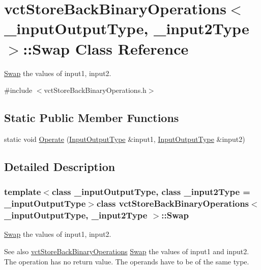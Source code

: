 \hypertarget{classvct_store_back_binary_operations_1_1_swap}{}\section{vct\+Store\+Back\+Binary\+Operations$<$ \+\_\+input\+Output\+Type, \+\_\+input2\+Type $>$\+:\+:Swap Class Reference}
\label{classvct_store_back_binary_operations_1_1_swap}


\hyperlink{classvct_store_back_binary_operations_1_1_swap}{Swap} the values of input1, input2.  




{\ttfamily \#include $<$vct\+Store\+Back\+Binary\+Operations.\+h$>$}

\subsection*{Static Public Member Functions}
\begin{DoxyCompactItemize}
\item 
static void \hyperlink{classvct_store_back_binary_operations_1_1_swap_a43e027b4bc4c1cceed2cc171c592c6f1}{Operate} (\hyperlink{classvct_store_back_binary_operations_a9dc481d9e1345541dd5d833d5e5688f3}{Input\+Output\+Type} \&input1, \hyperlink{classvct_store_back_binary_operations_a9dc481d9e1345541dd5d833d5e5688f3}{Input\+Output\+Type} \&input2)
\end{DoxyCompactItemize}


\subsection{Detailed Description}
\subsubsection*{template$<$class \+\_\+input\+Output\+Type, class \+\_\+input2\+Type = \+\_\+input\+Output\+Type$>$class vct\+Store\+Back\+Binary\+Operations$<$ \+\_\+input\+Output\+Type, \+\_\+input2\+Type $>$\+::\+Swap}

\hyperlink{classvct_store_back_binary_operations_1_1_swap}{Swap} the values of input1, input2. 

\begin{DoxySeeAlso}{See also}
\hyperlink{classvct_store_back_binary_operations}{vct\+Store\+Back\+Binary\+Operations} \hyperlink{classvct_store_back_binary_operations_1_1_swap}{Swap} the values of input1 and input2. The operation has no return value. The operands have to be of the same type. 
\end{DoxySeeAlso}


